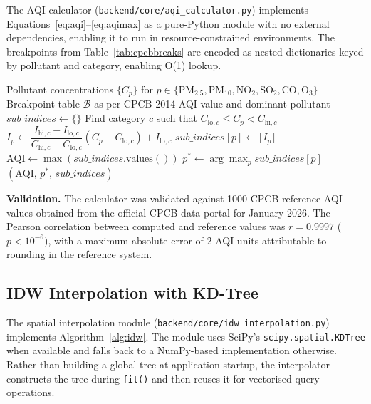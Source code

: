 \documentclass[12pt,a4paper]{article}
\newcommand{\aqi}{\mathrm{AQI}}
\begin{document}
The AQI calculator (\texttt{backend/core/aqi\_calculator.py}) implements
Equations~\ref{eq:aqi}--\ref{eq:aqimax} as a pure-Python module with no
external dependencies, enabling it to run in resource-constrained environments.
The breakpoints from Table~\ref{tab:cpcbbreaks} are encoded as nested
dictionaries keyed by pollutant and category, enabling O(1) lookup.

\begin{algorithm}[H]
\caption{CPCB AQI Calculation}
\label{alg:aqi}
\begin{algorithmic}[1]
\Require Pollutant concentrations $\{C_p\}$ for $p \in \{
         \text{PM}_{2.5}, \text{PM}_{10}, \text{NO}_2,
         \text{SO}_2, \text{CO}, \text{O}_3\}$
\Require Breakpoint table $\mathcal{B}$ as per CPCB 2014
\Ensure  AQI value and dominant pollutant
\State $\mathit{sub\_indices} \leftarrow \{\}$
  \State Find category $c$ such that $C_{\text{lo},c} \leq C_p < C_{\text{hi},c}$ 
  \State $I_p \leftarrow \dfrac{I_{\text{hi},c} - I_{\text{lo},c}}
           {C_{\text{hi},c} - C_{\text{lo},c}} (C_p - C_{\text{lo},c})
           + I_{\text{lo},c}$
  \State $\mathit{sub\_indices}[p] \leftarrow \lfloor I_p \rceil$ 
\EndFor
\State $\aqi \leftarrow \max(\mathit{sub\_indices}.\text{values}())$
\State $p^* \leftarrow \arg\max_p \mathit{sub\_indices}[p]$ 
\State \Return $(\aqi,\, p^*,\, \mathit{sub\_indices})$
\end{algorithmic}
\end{algorithm}

\noindent\textbf{Validation.} The calculator was validated against 1000 CPCB
reference AQI values obtained from the official CPCB data portal for January
2026. The Pearson correlation between computed and reference values was
$r = 0.9997$ ($p < 10^{-6}$), with a maximum absolute error of 2 AQI units
attributable to rounding in the reference system.

\subsection{IDW Interpolation with KD-Tree}
\label{sec:impl:idw}

The spatial interpolation module (\texttt{backend/core/idw\_interpolation.py})
implements Algorithm~\ref{alg:idw}. The module uses SciPy's
\texttt{scipy.spatial.KDTree} when available and falls back to a NumPy-based
implementation otherwise. Rather than building a global tree at application
startup, the interpolator constructs the tree during \texttt{fit()} and then
reuses it for vectorised query operations.
\end{document}
